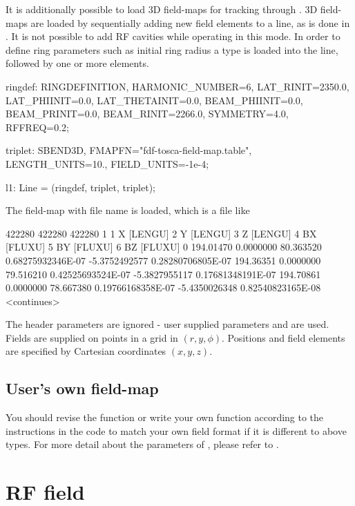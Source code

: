 It is additionally possible to load 3D field-maps for tracking through \opalcycl.
3D field-maps are loaded by sequentially adding new field elements to a line,
as is done in \opalt. It is not possible to add
RF cavities while operating in this mode. In order to define ring parameters
such as initial ring radius a  type is loaded into the line,
followed by one or more  elements.

\begin{example}
ringdef: RINGDEFINITION, HARMONIC_NUMBER=6, LAT_RINIT=2350.0, LAT_PHIINIT=0.0,
         LAT_THETAINIT=0.0, BEAM_PHIINIT=0.0, BEAM_PRINIT=0.0,
         BEAM_RINIT=2266.0, SYMMETRY=4.0, RFFREQ=0.2;

triplet: SBEND3D, FMAPFN="fdf-tosca-field-map.table", LENGTH_UNITS=10., FIELD_UNITS=-1e-4;

l1: Line = (ringdef, triplet, triplet);
\end{example}

The field-map with file name  is loaded, which is a
file like
\begin{example}
      422280      422280      422280           1
 1 X [LENGU]
 2 Y [LENGU]
 3 Z [LENGU]
 4 BX [FLUXU]
 5 BY [FLUXU]
 6 BZ [FLUXU]
 0
 194.01470 0.0000000 80.363520 0.68275932346E-07 -5.3752492577 0.28280706805E-07
 194.36351 0.0000000 79.516210 0.42525693524E-07 -5.3827955117 0.17681348191E-07
 194.70861 0.0000000 78.667380 0.19766168358E-07 -5.4350026348 0.82540823165E-08
<continues>
\end{example}
The header parameters are ignored - user supplied parameters 
and  are used. Fields are supplied on points in a grid in
$(r, y, \phi)$. Positions and field elements are specified by Cartesian
coordinates $(x, y, z)$.

\subsection{User's own field-map}

{ You should revise the function or write your own function according to the instructions in the code to match your own field
format if it is different to above types.}
For more detail about the parameters of , please refer to .

\section{RF field}
\label{sec:opalcycl:rffieldmap}
